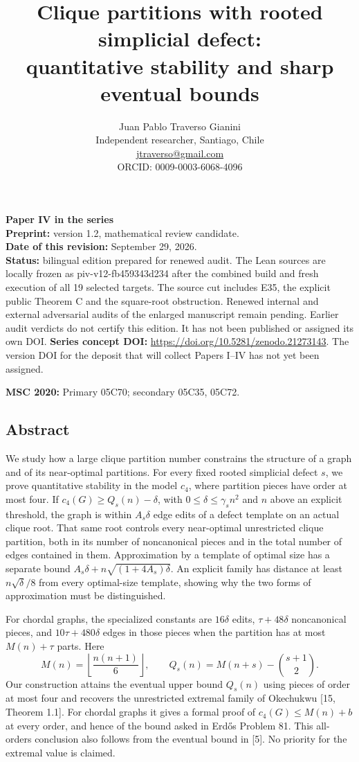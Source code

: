 \documentclass[english,11pt,a4paper]{article}
\title{Clique partitions with rooted simplicial defect:\\quantitative stability and sharp eventual bounds}
\author{Juan Pablo Traverso Gianini\\
\small Independent researcher, Santiago, Chile\\
\small \href{mailto:jtraverso@gmail.com}{jtraverso@gmail.com}\\
\small ORCID: 0009-0003-6068-4096}
\date{}
\begin{document}
\raggedbottom
\maketitle
\textbf{Paper IV in the series}\\
\textbf{Preprint:} version 1.2, mathematical review candidate.\\
\textbf{Date of this revision:} September 29, 2026.\\
\textbf{Status:} bilingual edition prepared for renewed audit. The Lean sources are locally frozen as {\ttfamily\small piv-\discretionary{\hbox{\ensuremath{\hookrightarrow}}}{}{}v12-\discretionary{\hbox{\ensuremath{\hookrightarrow}}}{}{}fb459343d234} after the combined build and fresh execution of all 19 selected targets. The source cut includes E35, the explicit public Theorem C and the square-root obstruction. Renewed internal and external adversarial audits of the enlarged manuscript remain pending. Earlier audit verdicts do not certify this edition. It has not been published or assigned its own DOI. \textbf{Series concept DOI:} \url{https://doi.org/10.5281/zenodo.21273143}. The version DOI for the deposit that will collect Papers I--IV has not yet been assigned.

\textbf{MSC 2020:} Primary 05C70; secondary 05C35, 05C72.

\subsection{Abstract}\label{abstract}

We study how a large clique partition number constrains the structure of a graph and of its near-optimal partitions. For every fixed rooted simplicial defect \(s\), we prove quantitative stability in the model \(c_4\), where partition pieces have order at most four. If \(c_4(G)\ge Q_s(n)-\delta\), with \(0\le\delta\le\gamma_s n^2\) and \(n\) above an explicit threshold, the graph is within \(A_s\delta\) edge edits of a defect template on an actual clique root. That same root controls every near-optimal unrestricted clique partition, both in its number of noncanonical pieces and in the total number of edges contained in them. Approximation by a template of optimal size has a separate bound \(A_s\delta+n\sqrt{(1+4A_s)\delta}\). An explicit family has distance at least \(n\sqrt{\delta}/8\) from every optimal-size template, showing why the two forms of approximation must be distinguished.

For chordal graphs, the specialized constants are \(16\delta\) edits, \(\tau+48\delta\) noncanonical pieces, and \(10\tau+480\delta\) edges in those pieces when the partition has at most \(M(n)+\tau\) parts. Here \[
M(n)=\left\lfloor\frac{n(n+1)}6\right\rfloor,\qquad
Q_s(n)=M(n+s)-\binom{s+1}{2}.
\] Our construction attains the eventual upper bound \(Q_s(n)\) using pieces of order at most four and recovers the unrestricted extremal family of Okechukwu {[}15, Theorem 1.1{]}. For chordal graphs it gives a formal proof of \(c_4(G)\le M(n)+b\) at every order, and hence of the bound asked in Erdős Problem 81. This all-orders conclusion also follows from the eventual bound in {[}5{]}. No priority for the extremal value is claimed.
\end{document}
